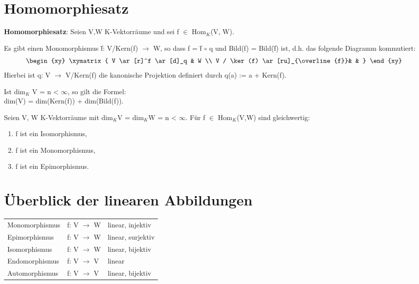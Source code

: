 \section{Homomorphiesatz}
\begin{theorem}
\textbf{Homomorphiesatz}: Seien V,W K-Vektorräume und sei f $\in$ Hom$_K$(V, W).
\begin{compactenum}
\item Es gibt einen Monomorphismus \={f}: V/Kern(f) $\to$ W, so dass f = \={f} $\circ$ q und Bild(f) = Bild(\={f}) ist, d.h. das folgende Diagramm kommutiert:
\begin{align*}
\begin{xy}
  \xymatrix{
      V \ar[r]^f \ar[d]_q &  W \\
      V / \ker(f) \ar[ru]_{\overline{f}}& &
  }
\end{xy}
\end{align*}
Hierbei ist q: V $\to$ V/Kern(f) die kanonische Projektion definiert durch q(a) := a + Kern(f).
\item Ist dim$_K$ V = n < $\infty$, so gilt die Formel: \\
dim(V) = dim(Kern(f)) + dim(Bild(f)).
\end{compactenum}
\end{theorem}
\begin{lemma}
Seien V, W K-Vektorräume mit dim$_K$V = dim$_K$W = n < $\infty$. Für f $\in$ Hom$_K$(V,W) sind gleichwertig:
\begin{enumerate}
\item f ist ein Isomorphismus,
\item f ist ein Monomorphismus, 
\item f ist ein Epimorphismus.
\end{enumerate}
\end{lemma}

\section{Überblick der linearen Abbildungen}
\begin{tabular}{lll}
Monomorphismus\index{Monomorphismus} & f: V $\to$ W& linear, injektiv\\
Epimorphismus\index{Epimorphismus} & f: V $\to$ W & linear, surjektiv\\
Isomorphismus\index{Isomorphismus} & f: V $\to$ W & linear, bijektiv\\
Endomorphismus\index{Endomorphismus} & f: V $\to$ V & linear\\
Automorphismus\index{Automorphismus} & f: V $\to$ V & linear, bijektiv\\
\end{tabular}

